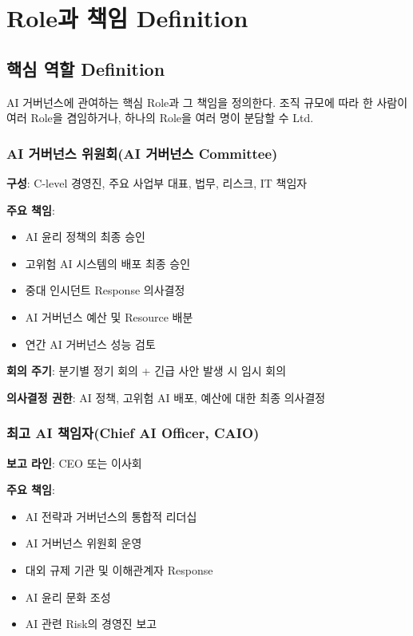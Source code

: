 \section{Role과 책임 Definition}
\label{sec:4.2}

\subsection{핵심 역할 Definition}
\label{sec:4.2.1}

AI 거버넌스에 관여하는 핵심 Role과 그 책임을 정의한다. 
조직 규모에 따라 한 사람이 여러 Role을 겸임하거나, 
하나의 Role을 여러 명이 분담할 수 Ltd.


\subsubsection{AI 거버넌스 위원회(AI 거버넌스 Committee)}

\textbf{구성}: 
C-level 경영진, 주요 사업부 대표, 법무, 리스크, IT 책임자

\textbf{주요 책임}:
\begin{itemize}
 \item AI 윤리 정책의 최종 승인
 \item 고위험 AI 시스템의 배포 최종 승인
 \item 중대 인시던트 Response 의사결정
 \item AI 거버넌스 예산 및 Resource 배분
 \item 연간 AI 거버넌스 성능 검토
\end{itemize}

\textbf{회의 주기}: 분기별 정기 회의 + 긴급 사안 발생 시 임시 회의

\textbf{의사결정 권한}: AI 정책, 고위험 AI 배포, 예산에 대한 최종 의사결정


\subsubsection{최고 AI 책임자(Chief AI Officer, CAIO)}

\textbf{보고 라인}: CEO 또는 이사회

\textbf{주요 책임}:
\begin{itemize}
 \item AI 전략과 거버넌스의 통합적 리더십
 \item AI 거버넌스 위원회 운영
 \item 대외 규제 기관 및 이해관계자\cite{winfield2018ethical} Response
 \item AI 윤리 문화 조성
 \item AI 관련 Risk의 경영진 보고
\end{itemize}

